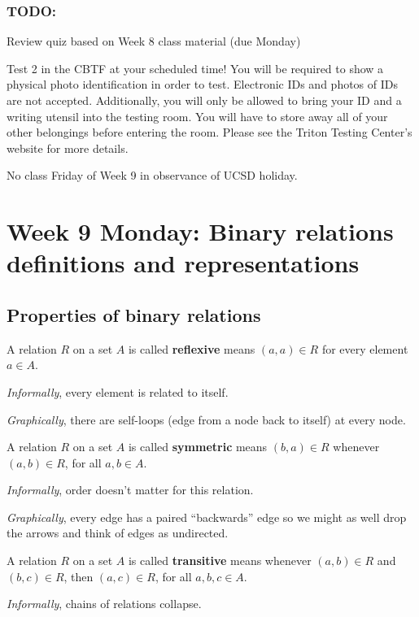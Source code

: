 \documentclass[12pt, oneside]{article}
\begin{document}
\subsubsection*{TODO:}
\begin{list}
   {\itemsep2pt}
    \item Review quiz based on Week 8 class material (due Monday)
    \item Test 2 in the CBTF at your scheduled time!
You will be required to show a physical photo identification in order
to test. Electronic IDs and photos of IDs are not accepted. Additionally, you will only be allowed
to bring your ID and a writing utensil into the testing room. You will have to store away all of
your other belongings before entering the room. Please see the Triton Testing Center's website
for more details.
    \item No class Friday of Week 9 in observance of UCSD holiday.

\end{list}

\newpage
\newpage
\section*{Week 9 Monday: Binary relations definitions and representations}
\subsection*{Properties of binary relations}


A relation $R$ on a set $A$ is called {\bf reflexive} 
means $(a, a) \in R$ for every element $a \in A$. 
 

{\it Informally}, every element is related to itself.

{\it Graphically}, there are self-loops (edge from a node back to itself) at 
every node. \vfill


A relation $R$ on a set $A$ is called {\bf symmetric} means 
$(b, a) \in R$ whenever $(a, b) \in R$, for all $a, b \in A$. 
 

{\it Informally}, order doesn't matter for this relation.

{\it Graphically}, every edge has a paired ``backwards'' edge so we might
as well drop the arrows and think of edges as undirected. \vfill


A relation $R$ on a set $A$ is called {\bf transitive} means 
whenever $(a, b) \in R$ and $(b, c) \in R$, then $(a, c) \in R$, for all $a, b, c \in A$.
 

{\it Informally}, chains of relations collapse.
\end{document}
